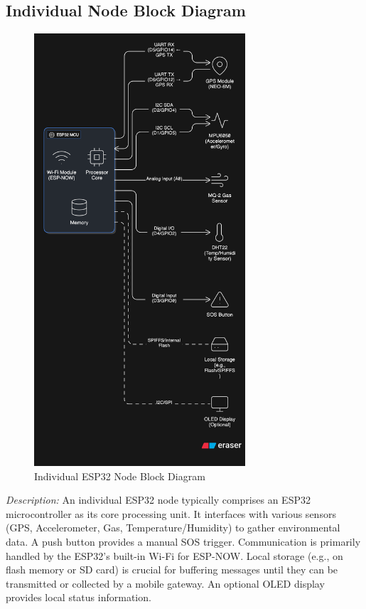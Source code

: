 \documentclass[12pt, a4paper]{article}
\begin{document}
\subsection{Individual Node Block Diagram}
\begin{figure}[htbp]
    \centering
    \includegraphics[width=0.7\textwidth]{image2.png} %
    \caption{Individual ESP32 Node Block Diagram}
    \label{fig:node_block_diagram}
\end{figure}
\textit{Description:} An individual ESP32 node typically comprises an ESP32 microcontroller as its core processing unit. It interfaces with various sensors (GPS, Accelerometer, Gas, Temperature/Humidity) to gather environmental data. A push button provides a manual SOS trigger. Communication is primarily handled by the ESP32's built-in Wi-Fi for ESP-NOW. Local storage (e.g., on flash memory or SD card) is crucial for buffering messages until they can be transmitted or collected by a mobile gateway. An optional OLED display provides local status information.
\end{document}
